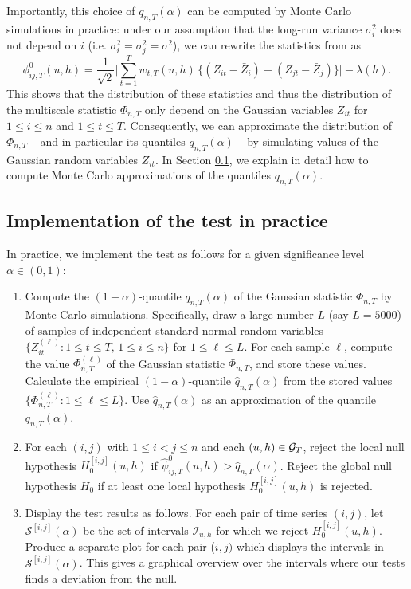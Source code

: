 \documentclass[12pt]{article}
\makeatletter
\renewcommand{\eqref}[1]{\tagform@{\ref{#1}}}
\makeatother
\begin{document}
\begin{remark}
Importantly, this choice of $q_{n,T}(\alpha)$ can be computed by Monte Carlo simulations in practice: under our assumption that the long-run variance $\sigma_i^2$ does not depend on $i$ (i.e. $\sigma_i^2 = \sigma^2_j = \sigma^2$), we can rewrite the statistics from \eqref{eq:phi_zero_ij} as
\[\phi^0_{ij, T}(u, h) = \frac{1}{\sqrt{2}} \Big|\sum\limits_{t=1}^T w_{t,T}(u, h) \, \big\{ (Z_{it} - \bar{Z}_i) - (Z_{jt} - \bar{Z}_j) \big\}\Big| - \lambda(h). \] 
This shows that the distribution of these statistics and thus the distribution of the multiscale statistic $\Phi_{n,T}$ only depend on the Gaussian variables $Z_{it}$ for $1 \le i \le n$ and $1 \le t \le T$. Consequently, we can approximate the distribution of $\Phi_{n,T}$ -- and in particular its quantiles $q_{n,T}(\alpha)$ -- by simulating values of the Gaussian random variables $Z_{it}$. In Section \ref{subsec:test:impl}, we explain in detail how to compute Monte Carlo approximations of the quantiles $q_{n,T}(\alpha)$. 
\end{remark}


\subsection{Implementation of the test in practice}\label{subsec:test:impl}


In practice, we implement the test as follows for a given significance level $\alpha \in (0, 1)$:
\begin{enumerate}[label=\textit{Step \arabic*.}, leftmargin=1.45cm]
\item Compute the $(1-\alpha)$-quantile $q_{n, T}(\alpha)$ of the Gaussian statistic $\Phi_{n,T}$ by Monte Carlo simulations. Specifically, draw a large number $L$ (say $L=5000$) of samples of independent standard normal random variables $\{Z_{it}^{(\ell)} : 1 \le t \le T, \, 1 \le i \le n \}$ for $1 \le \ell \le L$. For each sample $\ell$, compute the value $\Phi_{n,T}^{(\ell)}$ of the Gaussian statistic $\Phi_{n, T}$, and store these values. Calculate the empirical $(1-\alpha)$-quantile $\widehat{q}_{n, T}(\alpha)$ from the stored values $\{ \Phi_{n, T}^{(\ell)}: 1 \le \ell \le L \}$. Use $\widehat{q}_{n, T}(\alpha)$ as an approximation of the quantile $q_{n, T}(\alpha)$.
\item For each $(i, j)$ with $1 \le i < j \le n$ and each $(u, h) \in \mathcal{G}_T$, reject the local null hypothesis $H_0^{[i, j]}(u, h)$ if $\widehat{\psi}^0_{ij, T}(u, h)> \widehat{q}_{n, T}(\alpha)$. Reject the global null hypothesis $H_0$ if at least one local hypothesis $H_0^{[i, j]}(u, h)$ is rejected. 
\item Display the test results as follows. For each pair of time series $(i,j)$, let $\mathcal{S}^{[i, j]}(\alpha)$ be the set of intervals $\mathcal{I}_{u, h}$ for which we reject $H_0^{[i, j]}(u, h)$. Produce a separate plot for each pair ($i,j)$ which displays the intervals in $\mathcal{S}^{[i, j]}(\alpha)$. This gives a graphical overview over the intervals where our tests finds a deviation from the null. 
\end{enumerate}
\end{document}
